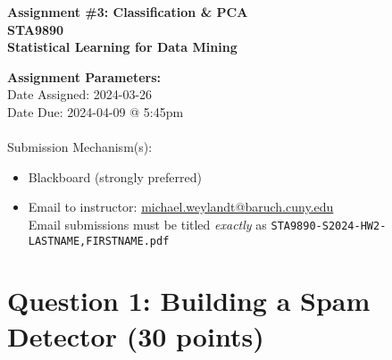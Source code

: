 \documentclass[10pt]{article}
\begin{document}
\begin{center}
    {\Large \bf Assignment \#3: Classification \& PCA \\ STA9890 \\ Statistical Learning for Data Mining}
\end{center}

{\bf Assignment Parameters:} \\
\phantom{abc}Date Assigned: 2024-03-26\\
\phantom{abc}Date Due: 2024-04-09 @ 5:45pm \\
~\\
\phantom{abc}Submission Mechanism(s):
\begin{itemize}
    \item Blackboard (strongly preferred)
    \item Email to instructor: \href{mailto:michael.weylandt@baruch.cuny.edu}{michael.weylandt@baruch.cuny.edu} \\ 
    {\small Email submissions must be titled \emph{exactly} as \texttt{STA9890-S2024-HW2-LASTNAME,FIRSTNAME.pdf}}
\end{itemize}

\section*{Question 1: Building a Spam Detector (30 points)}
\end{document}
